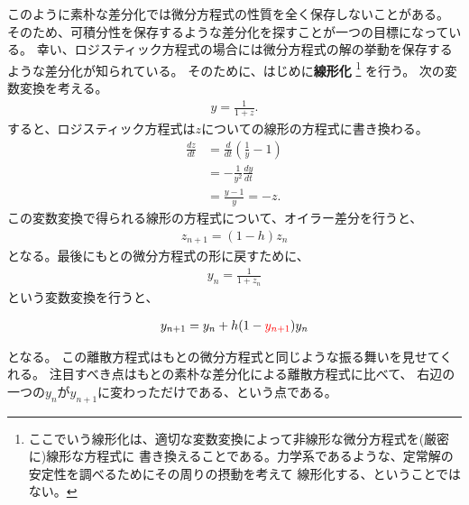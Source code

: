 \documentclass{jsarticle}
\begin{document}
このように素朴な差分化では微分方程式の性質を全く保存しないことがある。
そのため、可積分性を保存するような差分化を探すことが一つの目標になっている。
幸い、ロジスティック方程式の場合には微分方程式の解の挙動を保存するような差分化が知られている。
そのために、はじめに\textbf{線形化}
\footnote{ここでいう線形化は、適切な変数変換によって非線形な微分方程式を(厳密に)線形な方程式に
書き換えることである。力学系であるような、定常解の安定性を調べるためにその周りの摂動を考えて
線形化する、ということではない。}
を行う。
次の変数変換を考える。
\begin{align}
y=\frac{1}{1+z}.
\end{align}
すると、ロジスティック方程式は$z$についての線形の方程式に書き換わる。
\begin{align}
\frac{dz}{dt}&=\frac{d}{dt}\left(\frac{1}{y}-1\right)\\
&=-\frac{1}{y^{2}}\frac{dy}{dt}\\
&=\frac{y-1}{y}=-z.
\end{align}
この変数変換で得られる線形の方程式について、オイラー差分を行うと、
\begin{align}
z_{n+1}=(1-h)z_{n}
\end{align}
となる。最後にもとの微分方程式の形に戻すために、
\begin{align}
y_{n}=\frac{1}{1+z_{n}}
\end{align}
という変数変換を行うと、
\begin{framed}
\begin{align}
y_{n+1}=y_{n}+h(1-\textcolor{red}{y_{n+1}})y_{n}
\end{align}
\end{framed}
となる。
この離散方程式はもとの微分方程式と同じような振る舞いを見せてくれる。
注目すべき点はもとの素朴な差分化による離散方程式に比べて、
右辺の一つの$y_{n}$が$y_{n+1}$に変わっただけである、という点である。
\end{document}
